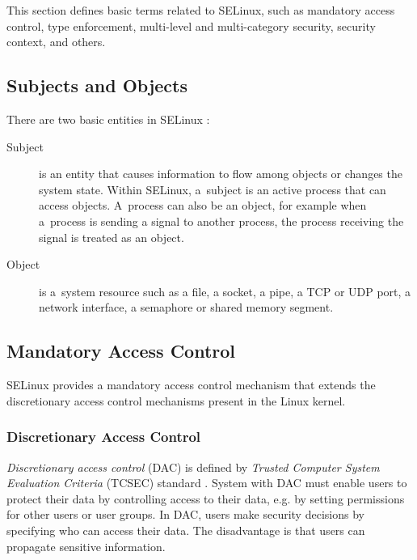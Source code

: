 This section defines basic terms related to SELinux, such as mandatory access
control, type enforcement, multi-level and multi-category security, security
context, and others.

\subsection{Subjects and Objects}
There are two basic entities in SELinux \cite[p.~29]{tsn}:
\begin{description}
    \item [Subject] is an entity that causes information to flow among objects
        or changes the system state. Within SELinux, a~subject is an active
        process that can access objects. A~process can also be an object, for
        example when a~process is sending a signal to another process, the
        process receiving the signal is treated as an object.
    \item [Object] is a~system resource such as a file, a socket, a pipe, a TCP
        or UDP port, a network interface, a semaphore or shared memory segment.
\end{description}

\subsection{Mandatory Access Control}

SELinux provides a mandatory access control mechanism that extends the
discretionary access control mechanisms present in the Linux kernel.

\subsubsection{Discretionary Access Control}
\emph{Discretionary access control} (DAC) is defined by \emph{Trusted Computer
System Evaluation Criteria} (TCSEC) standard \cite{orangebook}. System with DAC
must enable users to protect their data by controlling access to their data,
e.g. by setting permissions for other users or user groups. In DAC, users make
security decisions by specifying who can access their data. The disadvantage is
that users can propagate sensitive information.

